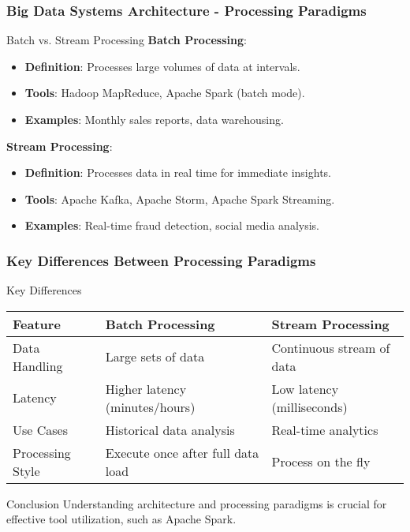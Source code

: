 \documentclass[aspectratio=169]{beamer}
\begin{document}
\begin{frame}[fragile]
  \frametitle{Big Data Systems Architecture - Processing Paradigms}
  \begin{block}{Batch vs. Stream Processing}
    \textbf{Batch Processing}:
    \begin{itemize}
      \item \textbf{Definition}: Processes large volumes of data at intervals.
      \item \textbf{Tools}: Hadoop MapReduce, Apache Spark (batch mode).
      \item \textbf{Examples}: Monthly sales reports, data warehousing.
    \end{itemize}
    
    \textbf{Stream Processing}:
    \begin{itemize}
      \item \textbf{Definition}: Processes data in real time for immediate insights.
      \item \textbf{Tools}: Apache Kafka, Apache Storm, Apache Spark Streaming.
      \item \textbf{Examples}: Real-time fraud detection, social media analysis.
    \end{itemize}
  \end{block}
\end{frame}

\begin{frame}[fragile]
  \frametitle{Key Differences Between Processing Paradigms}
  \begin{block}{Key Differences}
    \begin{tabular}{|l|l|l|}
      \hline
      \textbf{Feature} & \textbf{Batch Processing} & \textbf{Stream Processing} \\
      \hline
      Data Handling & Large sets of data & Continuous stream of data \\
      \hline
      Latency & Higher latency (minutes/hours) & Low latency (milliseconds) \\
      \hline
      Use Cases & Historical data analysis & Real-time analytics \\
      \hline
      Processing Style & Execute once after full data load & Process on the fly \\
      \hline
    \end{tabular}
  \end{block}

  \begin{block}{Conclusion}
    Understanding architecture and processing paradigms is crucial for effective tool utilization, such as Apache Spark.
  \end{block}
\end{frame}
\end{document}
